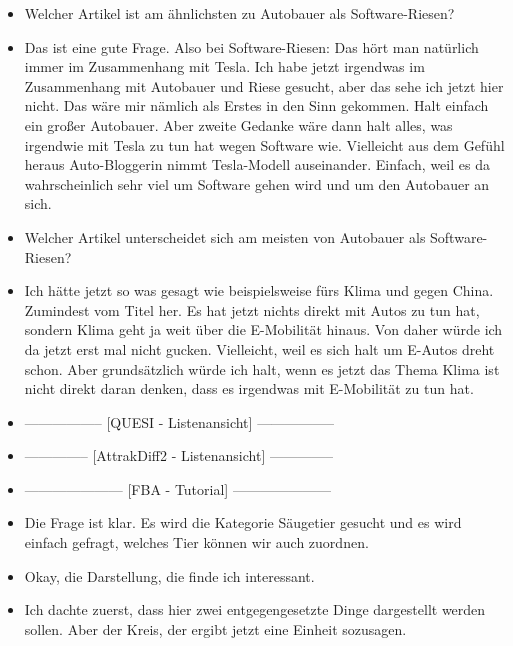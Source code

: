{\begin{itemize}[]
            \item {} Welcher Artikel ist am ähnlichsten zu \flqq Autobauer als Software-Riesen\frqq{}?
            \item {} Das ist eine gute Frage.
                  Also bei Software-Riesen: Das hört man natürlich immer im Zusammenhang mit Tesla.
                  Ich habe jetzt irgendwas im Zusammenhang mit Autobauer und Riese gesucht, aber das sehe ich jetzt hier nicht.
                  Das wäre mir nämlich als Erstes in den Sinn gekommen.
                  Halt einfach ein großer Autobauer.
                  Aber zweite Gedanke wäre dann halt alles, was irgendwie mit Tesla zu tun hat wegen Software wie.
                  Vielleicht aus dem Gefühl heraus \flqq Auto-Bloggerin nimmt Tesla-Modell auseinander\frqq{}.
                  Einfach, weil es da wahrscheinlich sehr viel um Software gehen wird und um den Autobauer an sich.
            \item {} Welcher Artikel unterscheidet sich am meisten von \flqq Autobauer als Software-Riesen\frqq{}?
            \item {} Ich hätte jetzt so was gesagt wie beispielsweise \flqq fürs Klima und gegen China\frqq{}.
                  Zumindest vom Titel her.
                  Es hat jetzt nichts direkt mit Autos zu tun hat, sondern Klima geht ja weit über die E-Mobilität hinaus.
                  Von daher würde ich da jetzt erst mal nicht gucken.
                  Vielleicht, weil es sich halt um E-Autos dreht schon.
                  Aber grundsätzlich würde ich halt, wenn es jetzt das Thema Klima ist nicht direkt daran denken, dass es irgendwas mit E-Mobilität zu tun hat.
            \item {-----------------} [QUESI - Listenansicht] {-----------------}
            \item {--------------} [AttrakDiff2 - Listenansicht] {--------------}
            \item {---------------------} [FBA - Tutorial] {---------------------}
            \item {} Die Frage ist klar.
                  Es wird die Kategorie Säugetier gesucht und es wird einfach gefragt, welches Tier können wir auch zuordnen.
            \item {} Okay, die Darstellung, die finde ich interessant.
            \item {} Ich dachte zuerst, dass hier zwei entgegengesetzte Dinge dargestellt werden sollen. Aber der Kreis, der ergibt jetzt eine Einheit sozusagen.

\end{itemize}}
